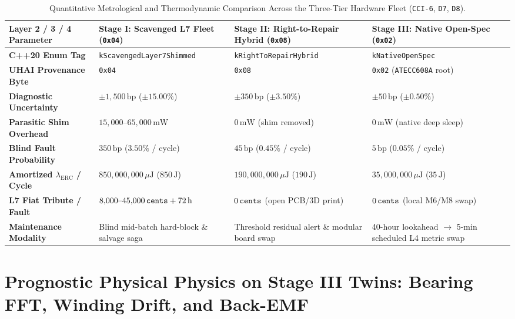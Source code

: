 \begin{table}[htbp]
\centering
\caption{Quantitative Metrological and Thermodynamic Comparison Across the Three-Tier Hardware Fleet (\texttt{CCI-6}, \texttt{D7}, \texttt{D8}).}
\label{tab:l2-three-tier-fleet-comparison}
\footnotesize
\begin{tabular}{@{}p{3.4cm}p{3.3cm}p{3.3cm}p{3.5cm}@{}}
\toprule
\textbf{Layer 2 / 3 / 4 Parameter} & \textbf{Stage I: Scavenged L7 Fleet (\texttt{0x04})} & \textbf{Stage II: Right-to-Repair Hybrid (\texttt{0x08})} & \textbf{Stage III: Native Open-Spec (\texttt{0x02})} \\
\midrule
\textbf{C++20 Enum Tag} & \texttt{kScavengedLayer7Shimmed} & \texttt{kRightToRepairHybrid} & \texttt{kNativeOpenSpec} \\
\textbf{UHAI Provenance Byte} & \texttt{0x04} & \texttt{0x08} & \texttt{0x02} (\texttt{ATECC608A} root) \\
\textbf{Diagnostic Uncertainty} & $\pm 1{,}500\,\mathrm{bp}$ ($\pm 15.00\%$) & $\pm 350\,\mathrm{bp}$ ($\pm 3.50\%$) & $\pm 50\,\mathrm{bp}$ ($\pm 0.50\%$) \\
\textbf{Parasitic Shim Overhead} & $15{,}000\text{--}65{,}000\,\mathrm{mW}$ & $0\,\mathrm{mW}$ (shim removed) & $0\,\mathrm{mW}$ (native deep sleep) \\
\textbf{Blind Fault Probability} & $350\,\mathrm{bp}$ ($3.50\%$ / cycle) & $45\,\mathrm{bp}$ ($0.45\%$ / cycle) & $5\,\mathrm{bp}$ ($0.05\%$ / cycle) \\
\textbf{Amortized $\lambda_{\mathrm{ERC}}$ / Cycle} & $850{,}000{,}000\,\mu\mathrm{J}$ ($850\,\mathrm{J}$) & $190{,}000{,}000\,\mu\mathrm{J}$ ($190\,\mathrm{J}$) & $35{,}000{,}000\,\mu\mathrm{J}$ ($35\,\mathrm{J}$) \\
\textbf{L7 Fiat Tribute / Fault} & $8{,}000\text{--}45{,}000\,\text{\texttt{cents}} + 72\,\mathrm{h}$ & $0\,\text{\texttt{cents}}$ (open PCB/3D print) & $0\,\text{\texttt{cents}}$ (local M6/M8 swap) \\
\textbf{Maintenance Modality} & Blind mid-batch hard-block \& salvage saga & Threshold residual alert \& modular board swap & 40-hour lookahead $\to$ 5-min scheduled L4 metric swap \\
\bottomrule
\end{tabular}
\end{table}

\section{Prognostic Physical Physics on Stage III Twins: Bearing FFT, Winding Drift, and Back-EMF}
\label{sec:l2-stage3-prognostic-physics}

